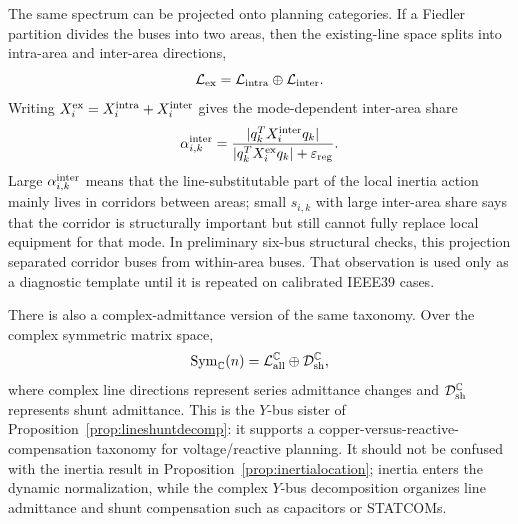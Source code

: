 \documentclass[journal]{IEEEtran}
\newcommand{\C}{\mathbb{C}}
\begin{document}
The same spectrum can be projected onto planning categories. If a Fiedler partition divides the buses into two areas, then the existing-line space splits into intra-area and inter-area directions,
\begin{equation}
\mathcal{L}_{\rm ex}
=\mathcal{L}_{\rm intra}\oplus\mathcal{L}_{\rm inter}.
\label{eq:arealeversplit}
\end{equation}
Writing $X_i^{\rm ex}=X_i^{\rm intra}+X_i^{\rm inter}$ gives the mode-dependent inter-area share
\begin{equation}
\alpha_{i,k}^{\rm inter}
=
\frac{|q_k^TX_i^{\rm inter}q_k|}
{|q_k^TX_i^{\rm ex}q_k|+\varepsilon_{\rm reg}}.
\label{eq:interareashare}
\end{equation}
Large $\alpha_{i,k}^{\rm inter}$ means that the line-substitutable part of the local inertia action mainly lives in corridors between areas; small $s_{i,k}$ with large inter-area share says that the corridor is structurally important but still cannot fully replace local equipment for that mode. In preliminary six-bus structural checks, this projection separated corridor buses from within-area buses. That observation is used only as a diagnostic template until it is repeated on calibrated IEEE39 cases.

There is also a complex-admittance version of the same taxonomy. Over the complex symmetric matrix space,
\begin{equation}
\operatorname{Sym}_{\C}(n)
=\mathcal{L}_{\rm all}^{\C}\oplus\mathcal{D}_{\rm sh}^{\C},
\label{eq:ybusdecomp}
\end{equation}
where complex line directions represent series admittance changes and $\mathcal{D}_{\rm sh}^{\C}$ represents shunt admittance. This is the $Y$-bus sister of Proposition~\ref{prop:lineshuntdecomp}: it supports a copper-versus-reactive-compensation taxonomy for voltage/reactive planning. It should not be confused with the inertia result in Proposition~\ref{prop:inertialocation}; inertia enters the dynamic normalization, while the complex $Y$-bus decomposition organizes line admittance and shunt compensation such as capacitors or STATCOMs.
\end{document}
